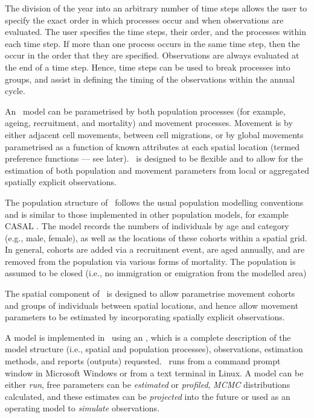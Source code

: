 The division of the year into an arbitrary number of time steps allows the user to specify the exact order in which processes occur and when observations are evaluated. The user specifies the time steps, their order, and the processes within each time step. If more than one process occurs in the same time step, then the occur in the order that they are specified. Observations are always evaluated at the end of a time step. Hence, time steps can be used to break processes into groups, and assist in defining the timing of the observations within the annual cycle. 

An \SPM\ model can be parametrised by both population processes (for example, ageing, recruitment, and mortality) and movement processes. Movement is by either adjacent cell movements, between cell migrations, or by global movements parametrised as a function of known attributes at each spatial location (termed preference functions --- see later). \SPM\ is designed to be flexible and to allow for the estimation of both population and movement parameters from local or aggregated spatially explicit observations. 

The population structure of \SPM\ follows the usual population modelling conventions and is similar to those implemented in other population models, for example CASAL \citep{1388}. The model records the numbers of individuals by age and category (e.g., male, female), as well as the locations of these cohorts within a spatial grid. In general, cohorts are added via a recruitment event, are aged annually, and are removed from the population via various forms of mortality. The population is assumed to be closed (i.e., no immigration or emigration from the modelled area)

The spatial component of \SPM\ is designed to allow parametrise movement cohorts and groups of individuals between spatial locations, and hence allow movement parameters to be estimated by incorporating spatially explicit observations. 

A model is implemented in \SPM\ using an \config {}, which is a complete description of the model structure (i.e., spatial and population processes), observations, estimation methods, and reports (outputs) requested. \SPM\ runs from a command prompt window in Microsoft Windows or from a text terminal in Linux. A model can be either \emph{run}, free parameters can be \emph{estimated} or \emph{profiled}, \emph{MCMC} distributions calculated, and these estimates can be \emph{projected} into the future or used as an operating model to \emph{simulate} observations.

